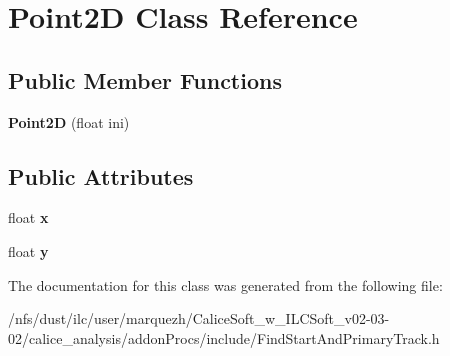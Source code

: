 \section{Point2\-D Class Reference}
\label{classPoint2D}
\subsection*{Public Member Functions}
\begin{DoxyCompactItemize}
\item 
{\bfseries Point2\-D} (float ini)\label{classPoint2D_aa9bd636a920bba7115ac65e18ce2b137}

\end{DoxyCompactItemize}
\subsection*{Public Attributes}
\begin{DoxyCompactItemize}
\item 
float {\bfseries x}\label{classPoint2D_a2a5ef0ad00bc9e912a9aefcedf004cc4}

\item 
float {\bfseries y}\label{classPoint2D_a989485fd2d8026ceec5d57e8c7e629ab}

\end{DoxyCompactItemize}


The documentation for this class was generated from the following file\-:\begin{DoxyCompactItemize}
\item 
/nfs/dust/ilc/user/marquezh/\-Calice\-Soft\-\_\-w\-\_\-\-I\-L\-C\-Soft\-\_\-v02-\/03-\/02/calice\-\_\-analysis/addon\-Procs/include/Find\-Start\-And\-Primary\-Track.\-h\end{DoxyCompactItemize}

